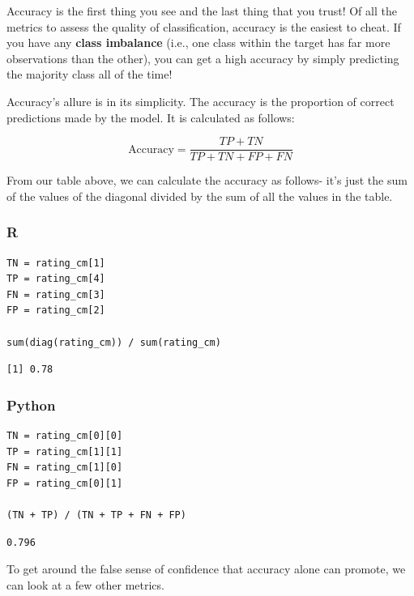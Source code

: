 \documentclass[
  letterpaper,
]{krantz}
\begin{document}
Accuracy is the first thing you see and the last thing that you trust!
Of all the metrics to assess the quality of classification, accuracy is
the easiest to cheat. If you have any \textbf{class imbalance} (i.e.,
one class within the target has far more observations than the other),
you can get a high accuracy by simply predicting the majority class all
of the time!

Accuracy's allure is in its simplicity. The accuracy is the proportion
of correct predictions made by the model. It is calculated as follows:

\[\text{Accuracy} = \frac{TP + TN}{TP + TN + FP + FN}\]

From our table above, we can calculate the accuracy as follows- it's
just the sum of the values of the diagonal divided by the sum of all the
values in the table.

\subsubsection{R}

\begin{verbatim}
TN = rating_cm[1]
TP = rating_cm[4]
FN = rating_cm[3]
FP = rating_cm[2]

sum(diag(rating_cm)) / sum(rating_cm)
\end{verbatim}

\begin{verbatim}
[1] 0.78
\end{verbatim}

\subsubsection{Python}

\begin{verbatim}
TN = rating_cm[0][0]
TP = rating_cm[1][1]
FN = rating_cm[1][0]
FP = rating_cm[0][1]

(TN + TP) / (TN + TP + FN + FP)
\end{verbatim}

\begin{verbatim}
0.796
\end{verbatim}

To get around the false sense of confidence that accuracy alone can
promote, we can look at a few other metrics.
\end{document}
